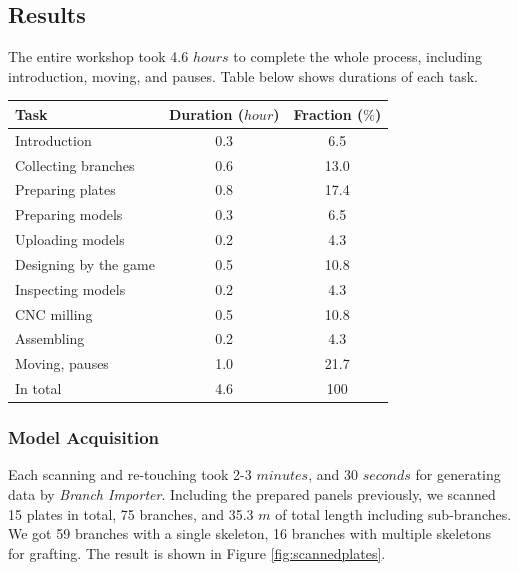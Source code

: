 \subsection{Results}


The entire workshop took 4.6 $hours$ to complete the whole process, including introduction, moving, and pauses.
Table below shows durations of each task.

\begin{center}
  \begin{tabulary}{\columnwidth}{ |l||C|C| }
    \hline
    Task & Duration ($hour$) & Fraction ($\%$) \\
    \hline
    Introduction                  & 0.3 & 6.5  \\
    Collecting branches           & 0.6 & 13.0  \\
    Preparing plates              & 0.8 & 17.4  \\
    Preparing models              & 0.3 & 6.5  \\
    Uploading models              & 0.2 & 4.3 \\
    Designing by the game         & 0.5 & 10.8 \\
    Inspecting models             & 0.2 & 4.3 \\
    CNC milling                   & 0.5 & 10.8\\
    Assembling                    & 0.2 & 4.3 \\
    Moving, pauses               & 1.0 & 21.7 \\
    \hline
    In total                      & 4.6   & 100 \\
    \hline
  \end{tabulary}
  \label{tab:timing}
\end{center}



\subsubsection*{Model Acquisition}
Each scanning and re-touching took 2-3 $minutes$, and 30 $seconds$ for generating data by \textit{Branch Importer}.
Including the prepared panels previously, we scanned 15 plates in total, 75 branches, and 35.3 $m$ of total length including sub-branches.
We got 59 branches with a single skeleton, 16 branches with multiple skeletons for grafting.
The result is shown in Figure \ref{fig:scannedplates}.

